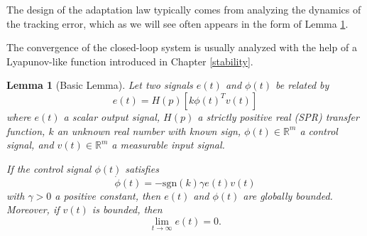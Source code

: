 \documentclass[
]{book}
\newtheorem{lemma}{Lemma}[chapter]
\theoremstyle{definition}
\theoremstyle{definition}
\theoremstyle{definition}
\theoremstyle{definition}
\theoremstyle{remark}
\begin{document}
The design of the adaptation law typically comes from analyzing the dynamics of the tracking error, which as we will see often appears in the form of Lemma \ref{lem:adaptivecontrolbasic}.

The convergence of the closed-loop system is usually analyzed with the help of a Lyapunov-like function introduced in Chapter \ref{stability}.

\begin{lemma}[Basic Lemma]
\protect\hypertarget{lem:adaptivecontrolbasic}{}\label{lem:adaptivecontrolbasic}Let two signals \(e(t)\) and \(\phi(t)\) be related by
\begin{equation}
e(t) = H(p)[k \phi(t)^T v(t)]
\label{eq:acbasiclemmaephi}
\end{equation}
where \(e(t)\) a scalar output signal, \(H(p)\) a strictly positive real (SPR) transfer function, \(k\) an unknown real number with known sign, \(\phi(t) \in \mathbb{R}^m\) a control signal, and \(v(t) \in \mathbb{R}^m\) a measurable input signal.

If the control signal \(\phi(t)\) satisfies
\begin{equation}
\dot{\phi}(t) = - \mathrm{sgn}(k) \gamma e(t) v(t)
\label{eq:acbasiclemmaphilaw}
\end{equation}
with \(\gamma > 0\) a positive constant, then \(e(t)\) and \(\phi(t)\) are globally bounded. Moreover, if \(v(t)\) is bounded, then
\[
\lim_{t \rightarrow \infty} e(t) = 0.
\]
\end{lemma}
\end{document}
